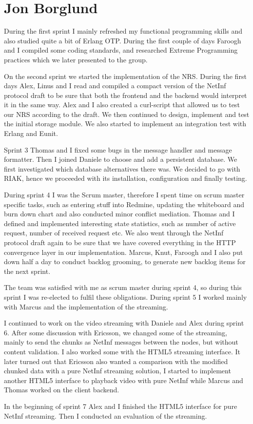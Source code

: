 \section{Jon Borglund}
During the first sprint I mainly refreshed my functional programming skills and also studied quite a bit of Erlang OTP.
During the first couple of days Faroogh and I compiled some coding standards, and researched Extreme Programming practices which we later presented to the group.

On the second sprint we started the implementation of the NRS. During the first days Alex, Linus and I read and compiled a compact version of the NetInf protocol draft to be sure that both the frontend and the backend would interpret it in the same way. Alex and I also created a curl-script that allowed us to test our NRS according to the draft. 
We then continued to design, implement and test the initial storage module. 
We also started to implement an integration test with Erlang and Eunit.

Sprint 3 Thomas and I fixed some bugs in the message handler and message formatter. Then I joined Daniele to choose and add a persistent database. We first investigated which database alternatives there was. We decided to go with RIAK, hence we proceeded with its installation, configuration and finally testing.

During sprint 4 I was the Scrum master, therefore I spent time on scrum master specific tasks, such as entering stuff into Redmine, updating the whiteboard and burn down chart and also conducted minor conflict mediation. 
Thomas and I defined and implemented interesting state statistics, such as number of active request, number of received request etc. We also went through the NetInf protocol draft again to be sure that we have covered everything in the HTTP convergence layer in our implementation.  Marcus, Knut, Faroogh and I also put down half a day to conduct backlog grooming, to generate new backlog items for the next sprint. 

The team was satisfied with me as scrum master during sprint 4, so during this sprint I was re-elected to fulfil these obligations. 
During sprint 5 I worked mainly with Marcus and the implementation of the streaming. 

I continued to work on the video streaming with Daniele and Alex during sprint 6. After some discussion with Ericsson, we changed some of the streaming, mainly to send the chunks as NetInf messages between the nodes, but without content validation. I also worked some with the HTML5 streaming interface. 
It later turned out that Ericsson also wanted a comparison with the modified chunked data with a pure NetInf streaming solution, I started to implement another HTML5 interface to playback video with pure NetInf while Marcus and Thomas worked on the client backend.

In the beginning of sprint 7 Alex and I finished the HTML5 interface for pure NetInf streaming. Then I conducted an evaluation of the streaming. 